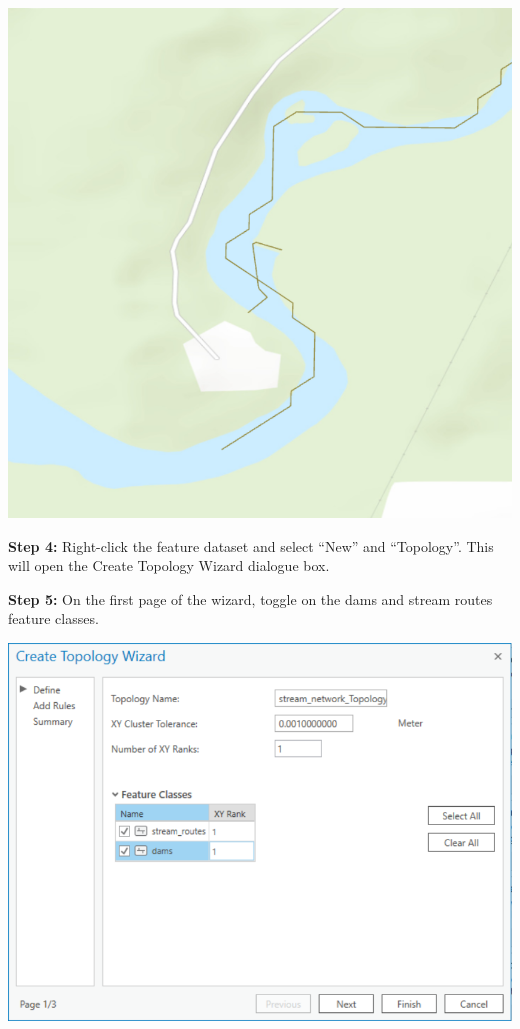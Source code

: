 \documentclass[
]{book}
\begin{document}
\includegraphics[width=1\linewidth]{images/02-example-dam}

\textbf{Step 4:} Right-click the feature dataset and select ``New'' and ``Topology''. This will open the Create Topology Wizard dialogue box.

\textbf{Step 5:} On the first page of the wizard, toggle on the dams and stream routes feature classes.

\includegraphics[width=1\linewidth]{images/02-create-topology-1}
\end{document}
